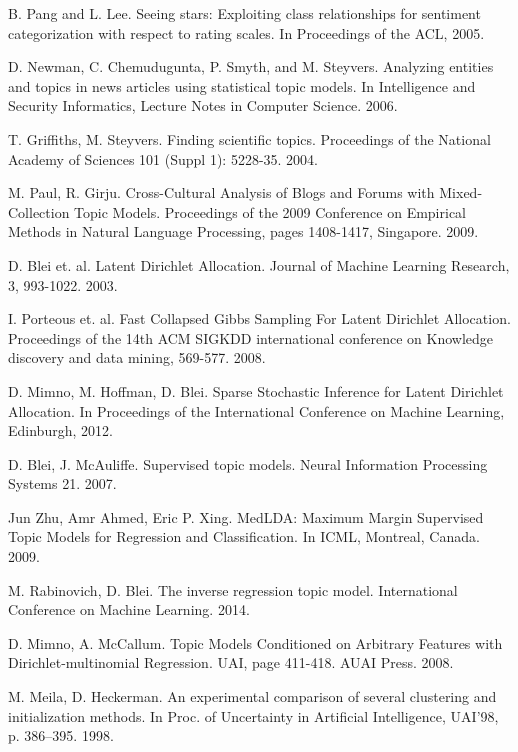 \documentclass{sig-alternate-2013}
\begin{document}
\begin{thebibliography}{1}
B. Pang and L. Lee.
Seeing stars: Exploiting class relationships for sentiment categorization with respect to rating scales.
In Proceedings of the ACL, 2005.

D. Newman, C. Chemudugunta, P. Smyth, and M. Steyvers. Analyzing entities and topics in news articles using statistical topic models.
In Intelligence and Security Informatics, Lecture Notes in Computer Science. 2006.

T. Griffiths, M. Steyvers.
Finding scientific topics.
Proceedings of the National Academy of Sciences 101 (Suppl 1): 5228-35. 2004.

M. Paul, R. Girju.
Cross-Cultural Analysis of Blogs and Forums with Mixed-Collection Topic Models.
Proceedings of the 2009 Conference on Empirical Methods in Natural Language Processing, pages 1408-1417,
Singapore. 2009.

D. Blei et. al.
Latent Dirichlet Allocation.
Journal of Machine Learning Research, 3, 993-1022.
2003.

I. Porteous et. al.
Fast Collapsed Gibbs Sampling For Latent Dirichlet Allocation.
Proceedings of the 14th ACM SIGKDD international conference on Knowledge discovery and data mining, 569-577.
2008.

D. Mimno, M. Hoffman, D. Blei.
Sparse Stochastic Inference for Latent Dirichlet Allocation.
In Proceedings of the International Conference on Machine Learning, Edinburgh, 2012.

D. Blei, J. McAuliffe.
Supervised topic models.
Neural Information Processing Systems 21. 2007.

Jun Zhu, Amr Ahmed, Eric P. Xing.
MedLDA: Maximum Margin Supervised Topic Models for Regression and Classification.
In ICML, Montreal, Canada. 2009.

M. Rabinovich, D. Blei.
The inverse regression topic model.
International Conference on Machine Learning. 2014.

D. Mimno, A. McCallum.
Topic Models Conditioned on Arbitrary Features with Dirichlet-multinomial Regression.
UAI, page 411-418. AUAI Press. 2008.

M. Meila, D. Heckerman.
An experimental comparison of several clustering and initialization methods.
In Proc. of Uncertainty in Artificial Intelligence, UAI'98, p. 386--395. 1998.


\end{thebibliography}
\end{document}
